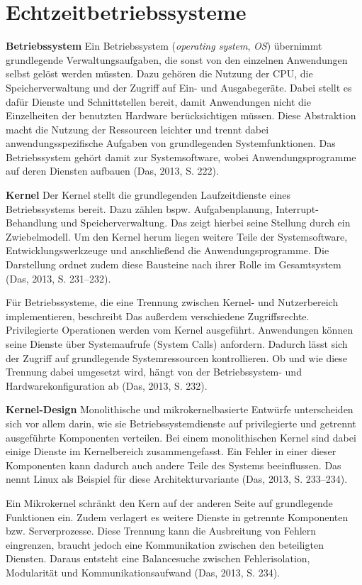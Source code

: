 \section{Echtzeitbetriebssysteme}
\textbf{Betriebssystem }Ein Betriebssystem (\emph{operating system}, \emph{OS}) übernimmt grundlegende Verwaltungsaufgaben, die sonst von den einzelnen Anwendungen selbst gelöst werden müssten. Dazu gehören die Nutzung der CPU, die Speicherverwaltung und der Zugriff auf Ein- und Ausgabegeräte. Dabei stellt es dafür Dienste und Schnittstellen bereit, damit Anwendungen nicht die Einzelheiten der benutzten Hardware berücksichtigen müssen. Diese Abstraktion macht die Nutzung der Ressourcen leichter und trennt dabei anwendungsspezifische Aufgaben von grundlegenden Systemfunktionen. Das Betriebssystem gehört damit zur Systemsoftware, wobei Anwendungsprogramme auf deren Diensten aufbauen (Das, 2013, S. 222).

\textbf{Kernel} Der Kernel stellt die grundlegenden Laufzeitdienste eines Betriebssystems bereit. Dazu zählen bspw. Aufgabenplanung, Interrupt-Behandlung und Speicherverwaltung. Das zeigt hierbei seine Stellung durch ein Zwiebelmodell. Um den Kernel herum liegen weitere Teile der Systemsoftware, Entwicklungswerkzeuge und anschließend die Anwendungsprogramme. Die Darstellung ordnet zudem diese Bausteine nach ihrer Rolle im Gesamtsystem (Das, 2013, S. 231–232).

Für Betriebssysteme, die eine Trennung zwischen Kernel- und Nutzerbereich implementieren, beschreibt Das außerdem verschiedene Zugriffsrechte. Privilegierte Operationen werden vom Kernel ausgeführt. Anwendungen können seine Dienste über Systemaufrufe (System Calls) anfordern. Dadurch lässt sich der Zugriff auf grundlegende Systemressourcen kontrollieren. Ob und wie diese Trennung dabei umgesetzt wird, hängt von der Betriebssystem- und Hardwarekonfiguration ab (Das, 2013, S. 232).

\textbf{Kernel-Design }Monolithische und mikrokernelbasierte Entwürfe unterscheiden sich vor allem darin, wie sie Betriebssystemdienste auf privilegierte und getrennt ausgeführte Komponenten verteilen. Bei einem monolithischen Kernel sind dabei einige Dienste im Kernelbereich zusammengefasst. Ein Fehler in einer dieser Komponenten kann dadurch auch andere Teile des Systems beeinflussen. Das nennt Linux als Beispiel für diese Architekturvariante (Das, 2013, S. 233–234).

Ein Mikrokernel schränkt den Kern auf der anderen Seite auf grundlegende Funktionen ein. Zudem verlagert es weitere Dienste in getrennte Komponenten bzw. Serverprozesse. Diese Trennung kann die Ausbreitung von Fehlern eingrenzen, braucht jedoch eine Kommunikation zwischen den beteiligten Diensten. Daraus entsteht eine Balancesuche zwischen Fehlerisolation, Modularität und Kommunikationsaufwand (Das, 2013, S. 234).

